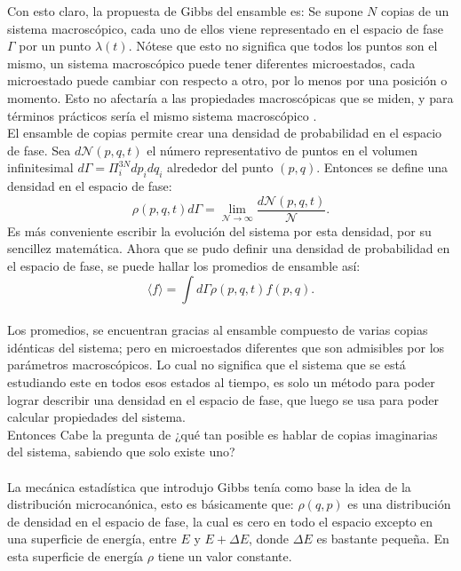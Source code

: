 Con esto claro, la propuesta de Gibbs del ensamble es: Se supone $N$ copias de un sistema macroscópico, cada uno de ellos viene representado en el espacio de fase $\Gamma$ por un punto $\lambda(t)$. Nótese que esto no significa  que todos los puntos son el mismo, un sistema macroscópico puede tener diferentes microestados, cada microestado puede cambiar con respecto a otro, por lo menos por una posición o momento. Esto no afectaría a las propiedades macroscópicas que se miden, y para términos prácticos sería el mismo sistema macroscópico \cite{KardarStat}.
\\
El ensamble de copias permite crear una densidad de probabilidad en el espacio de fase. Sea $d\mathcal{N}(p,q,t)$ el número representativo de puntos en el volumen infinitesimal $d\Gamma = \Pi^{3N}_{i}dp_{i}dq_{i}$ alrededor del punto $(p,q)$. Entonces se define una densidad en el espacio de fase:
\begin{equation}
\rho(p,q,t)d\Gamma= \lim_{\mathcal{N} \to \infty} \frac{d\mathcal{N}(p,q,t)}{\mathcal{N}}.
\end{equation}
Es más conveniente escribir la evolución del sistema por esta densidad, por su sencillez matemática. 
Ahora que se pudo definir una densidad de probabilidad en el espacio de fase, se puede hallar los promedios de ensamble así:
\begin{equation}
\langle f \rangle = \int d\Gamma \rho(p,q,t) f(p,q).
\end{equation}
\\
Los promedios, se encuentran gracias al ensamble compuesto de varias copias idénticas del sistema; pero en microestados diferentes que son admisibles por los parámetros macroscópicos. Lo cual no significa que el sistema que se está estudiando este en todos esos estados al tiempo, es solo un método para poder lograr describir una densidad en el espacio de fase, que luego se usa para poder calcular propiedades del sistema.\\
Entonces Cabe la pregunta de ¿qué tan posible es hablar de copias imaginarias del sistema, sabiendo que solo existe uno?
\\
\\
La mecánica estadística que introdujo Gibbs tenía como base la idea de la distribución microcanónica, esto es básicamente que: $\rho(q,p)$ es una distribución de densidad en el espacio de fase, la cual es cero en todo el espacio excepto en una superficie de energía, entre $E$ y $E+ \Delta E$, donde $\Delta E$ es bastante pequeña. En esta superficie de energía $\rho$ tiene un valor constante.
